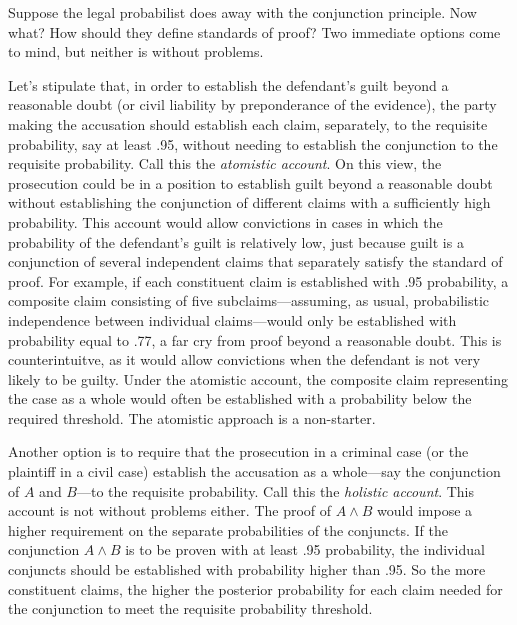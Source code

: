 \documentclass[
  10pt,
  dvipsnames,enabledeprecatedfontcommands]{scrartcl}
\newcommand{\et}{\wedge}
\begin{document}
Suppose the legal probabilist does away with the conjunction principle.
Now what? How should they define standards of proof? Two immediate
options come to mind, but neither is without problems.

Let's stipulate that, in order to establish the defendant's guilt beyond
a reasonable doubt (or civil liability by preponderance of the
evidence), the party making the accusation should establish each claim,
separately, to the requisite probability, say at least .95, without
needing to establish the conjunction to the requisite probability. Call
this the \textit{atomistic account}. On this view, the prosecution could
be in a position to establish guilt beyond a reasonable doubt without
establishing the conjunction of different claims with a sufficiently
high probability. This account would allow convictions in cases in which
the probability of the defendant's guilt is relatively low, just because
guilt is a conjunction of several independent claims that separately
satisfy the standard of proof. For example, if each constituent claim is
established with .95 probability, a composite claim consisting of five
subclaims---assuming, as usual, probabilistic independence between
individual claims---would only be established with probability equal to
.77, a far cry from proof beyond a reasonable doubt. This is
counterintuitve, as it would allow convictions when the defendant is not
very likely to be guilty. Under the atomistic account, the composite
claim representing the case as a whole would often be established with a
probability below the required threshold. The atomistic approach is a
non-starter.

Another option is to require that the prosecution in a criminal case (or
the plaintiff in a civil case) establish the accusation as a whole---say
the conjunction of \(A\) and \(B\)---to the requisite probability. Call
this the \textit{holistic account}. This account is not without problems
either. The proof of \(A\et B\) would impose a higher requirement on the
separate probabilities of the conjuncts. If the conjunction \(A\et B\)
is to be proven with at least .95 probability, the individual conjuncts
should be established with probability higher than .95. So the more
constituent claims, the higher the posterior probability for each claim
needed for the conjunction to meet the requisite probability threshold.
\end{document}
